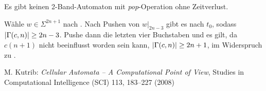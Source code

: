 \documentclass{article}
\begin{document}
\begin{satz}
    Es gibt keinen 2-Band-Automaton mit \emph{pop}-Operation ohne Zeitverlust.
    \begin{beweis}
        Wähle $w \in \Sigma^{2n+1}$ nach . Nach Pushen von $w \big|_{2n-3}$ gibt es nach  $t_0$, sodass $\lvert\Gamma(c,n)\rvert \geq 2n-3$. Pushe dann die letzten vier Buchstaben und es gilt, da $c(n+1)$ nicht beeinflusst worden sein kann, $\lvert\Gamma(c,n)\rvert \geq 2n+1$, im Widerspruch zu .
    \end{beweis}
\end{satz}

\begin{thebibliography}{9}

    M. Kutrib: \emph{Cellular Automata – A Computational Point of View}, Studies in Computational Intelligence (SCI) 113, 183–227 (2008)

\end{thebibliography}
\end{document}
